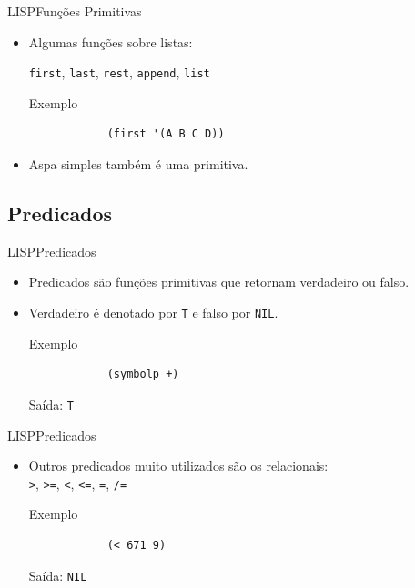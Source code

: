 \documentclass[12pt]{beamer} %
\begin{document}
\begin{frame}[fragile]{LISP}{Funções Primitivas}
	\begin{itemize}
	\setlength\itemsep{1.5em}
		\item Algumas funções sobre listas:

		\texttt{first}, \texttt{last}, \texttt{rest}, \texttt{append}, \texttt{list}\\[\baselineskip]

		\begin{block}{Exemplo}
			\begin{verbatim}
			(first '(A B C D))
			\end{verbatim}
		\end{block}

		\item Aspa simples também é uma primitiva.

	\end{itemize}
\end{frame}

\subsection{Predicados}

\begin{frame}[fragile]{LISP}{Predicados}
	\begin{itemize}
	\setlength\itemsep{1.5em}
		\item Predicados são funções primitivas que retornam verdadeiro ou falso.

		\item Verdadeiro é denotado por \texttt{T} e falso por \texttt{NIL}.\\[\baselineskip]
		
		\begin{block}{Exemplo}
			\begin{verbatim}
			(symbolp +)
			\end{verbatim}
			Saída: \texttt{T}
		\end{block}
	\end{itemize}
\end{frame}

\begin{frame}[fragile]{LISP}{Predicados}
	\begin{itemize}
	\setlength\itemsep{1.5em}
		\item Outros predicados muito utilizados são os relacionais:\\
		\texttt{>}, \texttt{>=}, \texttt{<}, \texttt{<=}, \texttt{=}, \texttt{/=}\\[\baselineskip]

		\begin{block}{Exemplo}
			\begin{verbatim}
			(< 671 9)
			\end{verbatim}
			Saída: \texttt{NIL}
		\end{block}

	\end{itemize}
\end{frame}
\end{document}

